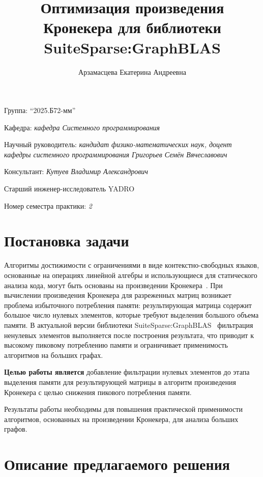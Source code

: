 \documentclass[a4paper]{article}
\title{Оптимизация произведения Кронекера для библиотеки SuiteSparse:GraphBLAS}
\author{Арзамасцева Екатерина Андреевна}
\date{}
\begin{document}
\maketitle

\begin{flushright}
    Группа: \enquote{2025.Б72-мм}

    Кафедра: \emph{кафедра Системного программирования}

    Научный руководитель: \emph{кандидат физико-математических наук, доцент кафедры системного программирования Григорьев Семён Вячеславович}

    Консультант: \emph{Кутуев Владимир Александрович}
    
    Старший инженер-исследователь YADRO
    
    Номер семестра практики: \emph{2}
\end{flushright} 

\section{Постановка задачи}

Алгоритмы достижимости с ограничениями в виде контекстно-свободных языков, основанные на операциях линейной алгебры и использующиеся для статического анализа кода, могут быть основаны на произведении Кронекера~\cite{orachev2020}. При вычислении произведения Кронекера для разреженных матриц возникает проблема избыточного потребления памяти: результирующая матрица содержит большое число нулевых элементов, которые требуют выделения большого объема памяти. В актуальной версии библиотеки SuiteSparse:GraphBLAS~\cite{graphblas} фильтрация ненулевых элементов выполняется после построения результата, что приводит к высокому пиковому потреблению памяти и ограничивает применимость алгоритмов на больших графах.

\textbf{Целью работы является} добавление фильтрации нулевых элементов до этапа выделения памяти для результирующей матрицы в алгоритм произведения Кронекера с целью снижения пикового потребления памяти.

Результаты работы необходимы для повышения практической применимости алгоритмов, основанных на произведении Кронекера, для анализа больших графов.

\section{Описание предлагаемого решения}
\end{document}
